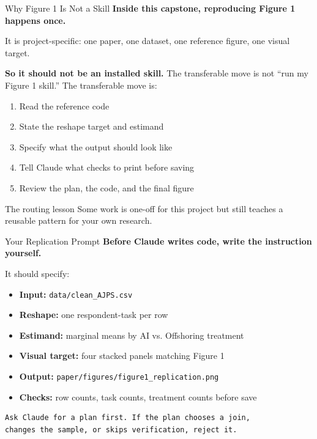 \documentclass[aspectratio=169, 11pt]{beamer}
\begin{document}
\begin{frame}{Why Figure 1 Is Not a Skill}
  \textbf{Inside this capstone, reproducing Figure 1 happens once.}

  \vspace{0.6em}
  It is project-specific: one paper, one dataset, one reference figure, one visual target.

  \vspace{0.8em}
  \textbf{So it should not be an installed skill.} The transferable move is not ``run my Figure 1 skill.'' The transferable move is:

  \vspace{0.5em}
  \begin{enumerate}\small
    \item Read the reference code
    \item State the reshape target and estimand
    \item Specify what the output should look like
    \item Tell Claude what checks to print before saving
    \item Review the plan, the code, and the final figure
  \end{enumerate}

  \vspace{0.5em}
  \begin{block}{The routing lesson}
    Some work is one-off for this project but still teaches a reusable pattern for your own research.
  \end{block}
\end{frame}

\begin{frame}[fragile]{Your Replication Prompt}
  \textbf{Before Claude writes code, write the instruction yourself.}

  \vspace{0.4em}
  It should specify:
  \begin{itemize}\small
    \item \textbf{Input:} \texttt{data/clean\_AJPS.csv}
    \item \textbf{Reshape:} one respondent-task per row
    \item \textbf{Estimand:} marginal means by AI vs. Offshoring treatment
    \item \textbf{Visual target:} four stacked panels matching Figure 1
    \item \textbf{Output:} \texttt{paper/figures/figure1\_replication.png}
    \item \textbf{Checks:} row counts, task counts, treatment counts before save
  \end{itemize}

  \vspace{0.4em}
  \begin{lstlisting}[basicstyle=\ttfamily\scriptsize]
Ask Claude for a plan first. If the plan chooses a join,
changes the sample, or skips verification, reject it.
  \end{lstlisting}
\end{frame}
\end{document}
